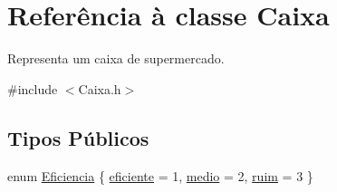 \hypertarget{class_caixa}{\section{Referência à classe Caixa}
\label{class_caixa}
}


Representa um caixa de supermercado.  




{\ttfamily \#include $<$Caixa.\+h$>$}

\subsection*{Tipos Públicos}
\begin{DoxyCompactItemize}
\item 
enum \hyperlink{class_caixa_a0e98d0cd8dc2ff4f73d637d73f7bbe85}{Eficiencia} \{ \hyperlink{class_caixa_a0e98d0cd8dc2ff4f73d637d73f7bbe85ac540cf6ebf89599c2551d4b9b03c48d7}{eficiente} = 1, 
\hyperlink{class_caixa_a0e98d0cd8dc2ff4f73d637d73f7bbe85a44121dbf9c403365d0a090127e43a499}{medio} = 2, 
\hyperlink{class_caixa_a0e98d0cd8dc2ff4f73d637d73f7bbe85ad22f3ab5e25a4b9e6c8f534a88a04c7a}{ruim} = 3
 \}
\end{DoxyCompactItemize}

